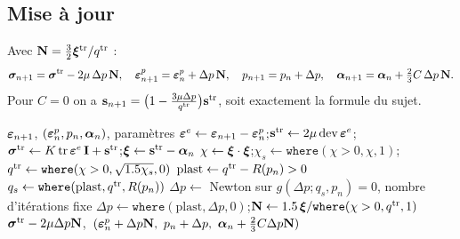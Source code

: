 \subsection{Mise à jour}

Avec $\mathbf{N} = \frac32\boldsymbol{\xi}^{\mathrm{tr}}/q^{\mathrm{tr}}$ :
\begin{equation}
\boldsymbol{\sigma}_{n+1} = \boldsymbol{\sigma}^{\mathrm{tr}} - 2\mu\,\Delta p\,\mathbf{N},\quad \boldsymbol{\varepsilon}^{p}_{n+1}=\boldsymbol{\varepsilon}^{p}_n+\Delta p\,\mathbf{N},\quad p_{n+1}=p_n+\Delta p,\quad \boldsymbol{\alpha}_{n+1}=\boldsymbol{\alpha}_n+\tfrac23C\,\Delta p\,\mathbf{N}.
\end{equation}
Pour $C=0$ on a $\mathbf{s}_{n+1}=\big(1-\frac{3\mu\Delta p}{q^{\mathrm{tr}}}\big)\mathbf{s}^{\mathrm{tr}}$, soit exactement la formule du sujet.

\begin{algorithm}[h]
\caption{Retour radial J2 (fonction , sans branchement Python)}\label{alg:rr}
\begin{algorithmic}[1]
\Require $\boldsymbol{\varepsilon}_{n+1}$, $(\boldsymbol{\varepsilon}^{p}_n,p_n,\boldsymbol{\alpha}_n)$, paramètres
\State $\boldsymbol{\varepsilon}^e\gets\boldsymbol{\varepsilon}_{n+1}-\boldsymbol{\varepsilon}^{p}_n$;\quad $\mathbf{s}^{\mathrm{tr}}\gets2\mu\operatorname{dev}\boldsymbol{\varepsilon}^e$;\quad $\boldsymbol{\sigma}^{\mathrm{tr}}\gets K\operatorname{tr}\boldsymbol{\varepsilon}^e\,\mathbf{I}+\mathbf{s}^{\mathrm{tr}}$;\quad $\boldsymbol{\xi}\gets\mathbf{s}^{\mathrm{tr}}-\boldsymbol{\alpha}_n$
\State $\chi\gets\boldsymbol{\xi}\cdot\boldsymbol{\xi}$;\quad $\chi_s\gets\mathtt{where}(\chi>0,\chi,1)$;\quad $q^{\mathrm{tr}}\gets\mathtt{where}(\chi>0,\sqrt{1.5\chi_s},0)$ 
\State $\mathrm{plast}\gets q^{\mathrm{tr}}-R(p_n)>0$
\State $q_s\gets\mathtt{where}(\mathrm{plast},q^{\mathrm{tr}},R(p_n))$ 
\State $\Delta p\gets$ Newton sur $g(\Delta p;q_s,p_n)=0$, nombre d'itérations fixe 
\State $\Delta p\gets\mathtt{where}(\mathrm{plast},\Delta p,0)$;\quad $\mathbf{N}\gets1.5\,\boldsymbol{\xi}/\mathtt{where}(\chi>0,q^{\mathrm{tr}},1)$
\State \Return $\boldsymbol{\sigma}^{\mathrm{tr}}-2\mu\Delta p\mathbf{N}$,\ $(\epsp_n+\Delta p\N,\ p_n+\Delta p,\ \X_n+\frac23C\Delta p\N)$
\end{algorithmic}
\end{algorithm}

